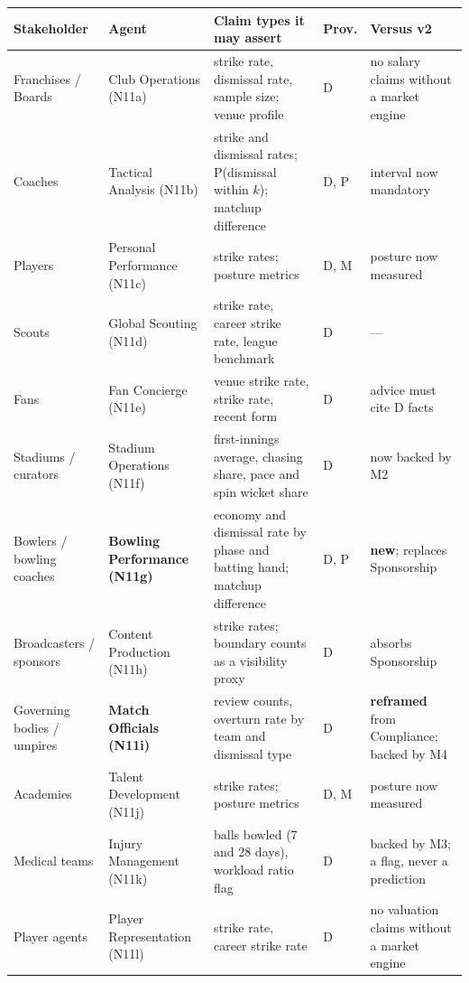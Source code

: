 \documentclass[11pt,a4paper]{article}
\begin{document}
\begin{center}
\footnotesize
\renewcommand{\arraystretch}{1.25}
\begin{tabular}{@{}>{\raggedright\arraybackslash}p{2.5cm}
                  >{\raggedright\arraybackslash}p{2.9cm}
                  >{\raggedright\arraybackslash}p{5.5cm}
                  >{\raggedright\arraybackslash}p{0.9cm}
                  >{\raggedright\arraybackslash}p{3.0cm}@{}}
\toprule
\textbf{Stakeholder} & \textbf{Agent} & \textbf{Claim types it may assert} & \textbf{Prov.} & \textbf{Versus v2} \\
\midrule
Franchises / Boards & Club Operations (N11a) & strike rate, dismissal rate, sample size; venue profile & D & no salary claims without a market engine \\
Coaches & Tactical Analysis (N11b) & strike and dismissal rates; P(dismissal within $k$); matchup difference & D, P & interval now mandatory \\
Players & Personal Performance (N11c) & strike rates; posture metrics & D, M & posture now measured \\
Scouts & Global Scouting (N11d) & strike rate, career strike rate, league benchmark & D & --- \\
Fans & Fan Concierge (N11e) & venue strike rate, strike rate, recent form & D & advice must cite D facts \\
Stadiums / curators & Stadium Operations (N11f) & first-innings average, chasing share, pace and spin wicket share & D & now backed by M2 \\
Bowlers / bowling coaches & \textbf{Bowling Performance (N11g)} & economy and dismissal rate by phase and batting hand; matchup difference & D, P & \textbf{new}; replaces Sponsorship \\
Broadcasters / sponsors & Content Production (N11h) & strike rates; boundary counts as a visibility proxy & D & absorbs Sponsorship \\
Governing bodies / umpires & \textbf{Match Officials (N11i)} & review counts, overturn rate by team and dismissal type & D & \textbf{reframed} from Compliance; backed by M4 \\
Academies & Talent Development (N11j) & strike rates; posture metrics & D, M & posture now measured \\
Medical teams & Injury Management (N11k) & balls bowled (7 and 28 days), workload ratio flag & D & backed by M3; a flag, never a prediction \\
Player agents & Player Representation (N11l) & strike rate, career strike rate & D & no valuation claims without a market engine \\
\bottomrule
\end{tabular}
\label{tab:roster}
\end{center}
\end{document}
